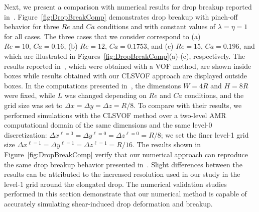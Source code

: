 \documentclass[%
 reprint,
 showkeys,
 amsmath,amssymb,
 aps,
 prfluids,
 onecolumn
]{revtex4-2}
\begin{document}
Next, we present a comparison with numerical results for drop breakup reported
in~\cite{RenCri01-2}.  Figure~\ref{fig:DropBreakComp} demonstrates drop breakup
with pinch-off behavior for three $Re$ and $Ca$ conditions and with constant
values of $\lambda = \eta = 1$ for all cases.  The three cases that we consider
correspond to (a) $Re = 10, \, Ca = 0.16$, (b) $Re = 12, \, Ca = 0.1753$, and
(c) $Re = 15, \, Ca = 0.196$, and which are illustrated in
Figures~\ref{fig:DropBreakComp}(a)-(c), respectively.  The results reported
in~\cite{RenCri01-2}, which were obtained with a VOF method, are shown inside
boxes while results obtained with our CLSVOF approach are displayed outside
boxes.  In the computations presented in~\cite{RenCri01-2}, the dimensions
$W=4R$ and $H=8R$ were fixed, while $L$ was changed depending on $Re$ and $Ca$
conditions, and the grid size was set to $\Delta x=\Delta y=\Delta z=R/8$.  To
compare with their results, we performed simulations with the CLSVOF method
over a two-level AMR computational domain of the same dimensions and the same
level-0 discretization: $\Delta x^{\ell=0} = \Delta y^{\ell=0} = \Delta
z^{\ell=0} = R/8$; we set the finer level-1 grid size $\Delta x^{\ell=1} =
\Delta y^{\ell=1} = \Delta z^{\ell=1} = R/16$.  The results shown in
Figure~\ref{fig:DropBreakComp} verify that our numerical approach can reproduce
the same drop breakup behavior presented in~\cite{RenCri01-2}.  Slight
differences between the results can be attributed to the increased resolution
used in our study in the level-1 grid around the elongated drop.  The numerical
validation studies performed in this section demonstrate that our numerical
method is capable of accurately simulating shear-induced drop deformation and
breakup.
\end{document}
